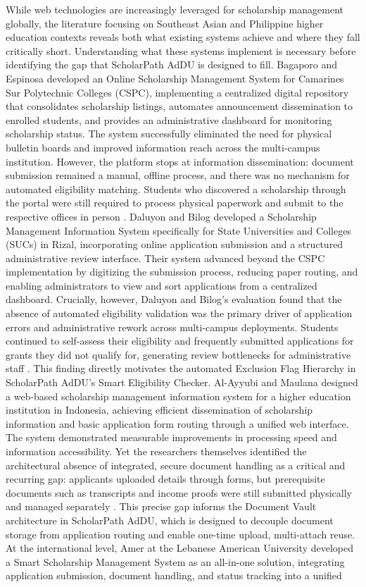 While web technologies are increasingly leveraged for scholarship management globally, the literature focusing on Southeast Asian and Philippine higher education contexts reveals both what existing systems achieve and where they fall critically short. Understanding what these systems implement is necessary before identifying the gap that ScholarPath AdDU is designed to fill. Bagaporo and Espinosa \cite{ref12} developed an Online Scholarship Management System for Camarines Sur Polytechnic Colleges (CSPC), implementing a centralized digital repository that consolidates scholarship listings, automates announcement dissemination to enrolled students, and provides an administrative dashboard for monitoring scholarship status. The system successfully eliminated the need for physical bulletin boards and improved information reach across the multi-campus institution. However, the platform stops at information dissemination: document submission remained a manual, offline process, and there was no mechanism for automated eligibility matching. Students who discovered a scholarship through the portal were still required to process physical paperwork and submit to the respective offices in person \cite{ref12}. Daluyon and Bilog \cite{ref14} developed a Scholarship Management Information System specifically for State Universities and Colleges (SUCs) in Rizal, incorporating online application submission and a structured administrative review interface. Their system advanced beyond the CSPC implementation by digitizing the submission process, reducing paper routing, and enabling administrators to view and sort applications from a centralized dashboard. Crucially, however, Daluyon and Bilog's evaluation found that the absence of automated eligibility validation was the primary driver of application errors and administrative rework across multi-campus deployments. Students continued to self-assess their eligibility and frequently submitted applications for grants they did not qualify for, generating review bottlenecks for administrative staff \cite{ref14}. This finding directly motivates the automated Exclusion Flag Hierarchy in ScholarPath AdDU's Smart Eligibility Checker. Al-Ayyubi and Maulana \cite{ref3} designed a web-based scholarship management information system for a higher education institution in Indonesia, achieving efficient dissemination of scholarship information and basic application form routing through a unified web interface. The system demonstrated measurable improvements in processing speed and information accessibility. Yet the researchers themselves identified the architectural absence of integrated, secure document handling as a critical and recurring gap: applicants uploaded details through forms, but prerequisite documents such as transcripts and income proofs were still submitted physically and managed separately \cite{ref3}. This precise gap informs the Document Vault architecture in ScholarPath AdDU, which is designed to decouple document storage from application routing and enable one-time upload, multi-attach reuse. At the international level, Amer \cite{ref5} at the Lebanese American University developed a Smart Scholarship Management System as an all-in-one solution, integrating application submission, document handling, and status tracking into a unified 